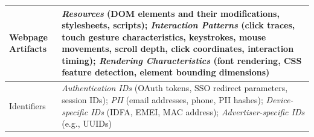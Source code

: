 \begin{table}[ht]
\begin{tabular}{@{} p{3.4cm} p{13.8cm} @{}}
\midrule

Webpage Artifacts &
  \textit{Resources} (DOM elements and their modifications, stylesheets, scripts);
  \textit{Interaction Patterns} (click traces, touch gesture characteristics, keystrokes, mouse movements, scroll depth, click coordinates, interaction timing);
  \textit{Rendering Characteristics} (font rendering, CSS feature detection, element bounding dimensions) \\

\midrule

Identifiers &
  \textit{Authentication IDs} (OAuth tokens, SSO redirect parameters, session IDs);
  \textit{PII} (email addresses, phone, PII hashes);
  \textit{Device-specific IDs} (IDFA, EMEI, MAC address); 
  \textit{Advertiser-specific IDs} (e.g., UUIDs)\\

\bottomrule
\end{tabular}
\end{table}
